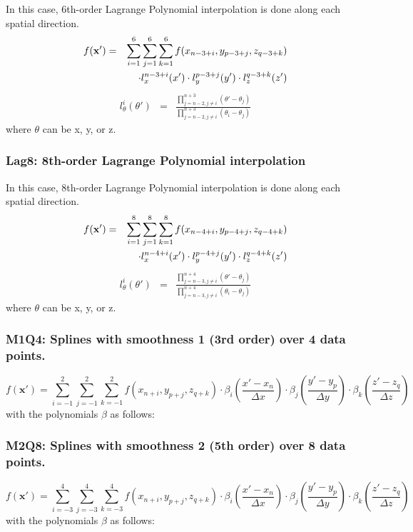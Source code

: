 \documentclass[11pt]{article}
\def\bea{\begin{eqnarray}}
\def\eea{\end{eqnarray}}
\begin{document}
In this case, 6th-order Lagrange Polynomial interpolation is done along each spatial direction.
\bea f({\bf x'}) &=&
\sum_{i=1}^6\sum_{j=1}^6\sum_{k=1}^6f(x_{n-3+i},y_{p-3+j},z_{q-3+k})\nonumber\\
&&\cdot l_x^{n-3+i}(x')\cdot l_y^{p-3+j}(y')\cdot
l_z^{q-3+k}(z')\eea \bea l_\theta^i(\theta') &=&
\frac{\prod\limits_{j=n-2,j\neq
i}^{n+3}(\theta'-\theta_j)}{\prod\limits_{j=n-2,j\neq
i}^{n+3}(\theta_i-\theta_j)}\eea where $\theta$ can be x, y, or z.

\subsubsection*{Lag8: 8th-order Lagrange Polynomial interpolation}

In this case, 8th-order Lagrange Polynomial interpolation is done along each spatial direction.
\bea f({\bf x'}) &=&
\sum_{i=1}^8\sum_{j=1}^8\sum_{k=1}^8f(x_{n-4+i},y_{p-4+j},z_{q-4+k})\nonumber\\
&&\cdot l_x^{n-4+i}(x')\cdot l_y^{p-4+j}(y')\cdot
l_z^{q-4+k}(z')\eea \bea l_\theta^i(\theta') &=&
\frac{\prod\limits_{j=n-3,j\neq
i}^{n+4}(\theta'-\theta_j)}{\prod\limits_{j=n-3,j\neq
i}^{n+4}(\theta_i-\theta_j)}\eea where $\theta$ can be x, y, or z.

\subsubsection*{M1Q4: Splines with smoothness 1 (3rd order) over 4 data points.}
\begin{equation}
    f(\mathbf{x}') =
    \sum_{i=-1}^2 \sum_{j=-1}^2 \sum_{k=-1}^2
    f(x_{n+i}, y_{p+j}, z_{q+k})
    \cdot \beta_i\left(\frac{x' - x_n}{\Delta x}\right)
    \cdot \beta_j\left(\frac{y' - y_p}{\Delta y}\right)
    \cdot \beta_k\left(\frac{z' - z_q}{\Delta z}\right)
\end{equation}
with the polynomials $\beta$ as follows:

\subsubsection*{M2Q8: Splines with smoothness 2 (5th order) over 8 data points.}
\begin{equation}
    f(\mathbf{x}') =
    \sum_{i=-3}^4 \sum_{j=-3}^4 \sum_{k=-3}^4
    f(x_{n+i}, y_{p+j}, z_{q+k})
    \cdot \beta_i\left(\frac{x' - x_n}{\Delta x}\right)
    \cdot \beta_j\left(\frac{y' - y_p}{\Delta y}\right)
    \cdot \beta_k\left(\frac{z' - z_q}{\Delta z}\right)
\end{equation}
with the polynomials $\beta$ as follows:

\end{document}
